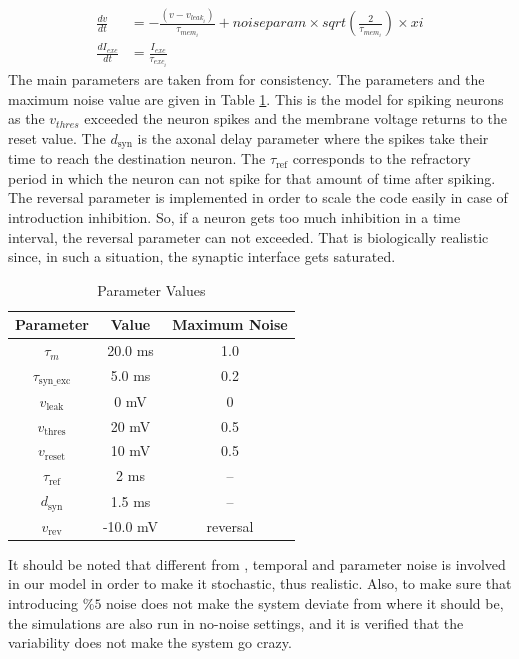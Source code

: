 \documentclass[a4paper,12pt]{article}
\begin{document}
\begin{equation}
    \begin{split}
        \frac{dv}{dt} & = -\frac{(v - v_{leak_i})}{\tau_{mem_i}}+ noiseparam \times sqrt(\frac{2}{\tau_{mem_i}}) \times xi \\
        \frac{dI_{exc}}{dt} & = \frac{I_{exc}}{\tau_{exc_i}}
    \end{split}
    \label{diff_eqn}
\end{equation}
The main parameters are taken from \cite{brunel} for consistency. The parameters and the maximum noise value are given in Table \ref{parameterset}. This is the model for spiking neurons as the $v_{thres}$ exceeded the neuron spikes and the membrane voltage returns to the reset value. The $d_{\text{syn}}$ is the axonal delay parameter where the spikes take their time to reach the destination neuron. The $\tau_{\text{ref}}$ corresponds to the refractory period in which the neuron can not spike for that amount of time after spiking. The reversal parameter is implemented in order to scale the code easily in case of introduction inhibition. So, if a neuron gets too much inhibition in a time interval, the reversal parameter can not exceeded. That is biologically realistic since, in such a situation, the synaptic interface gets saturated.

\begin{table}[h]
    \centering
    \begin{tabular}{|c|c|c|}
    \hline
    Parameter & Value & Maximum Noise \\
    \hline
    $\tau_m$ & 20.0 ms & 1.0 \\
    $\tau_{\text{syn\_exc}}$ & 5.0 ms & 0.2 \\
    $v_{\text{leak}}$ & 0 mV & 0 \\
    $v_{\text{thres}}$ & 20 mV & 0.5 \\
    $v_{\text{reset}}$ & 10 mV & 0.5 \\
    $\tau_{\text{ref}}$ & 2 ms & -- \\
    $d_{\text{syn}}$ & 1.5 ms & -- \\
    $v_{\text{rev}}$ & -10.0 mV & reversal \\
    \hline
    \end{tabular}
    \caption{Parameter Values}
    \label{parameterset}
\end{table}
It should be noted that different from \cite{brunel}, temporal and parameter noise is involved in our model in order to make it stochastic, thus realistic. Also, to make sure that introducing $\% 5$ noise does not make the system deviate from where it should be, the simulations are also run in no-noise settings, and it is verified that the variability does not make the system go crazy.
\end{document}
